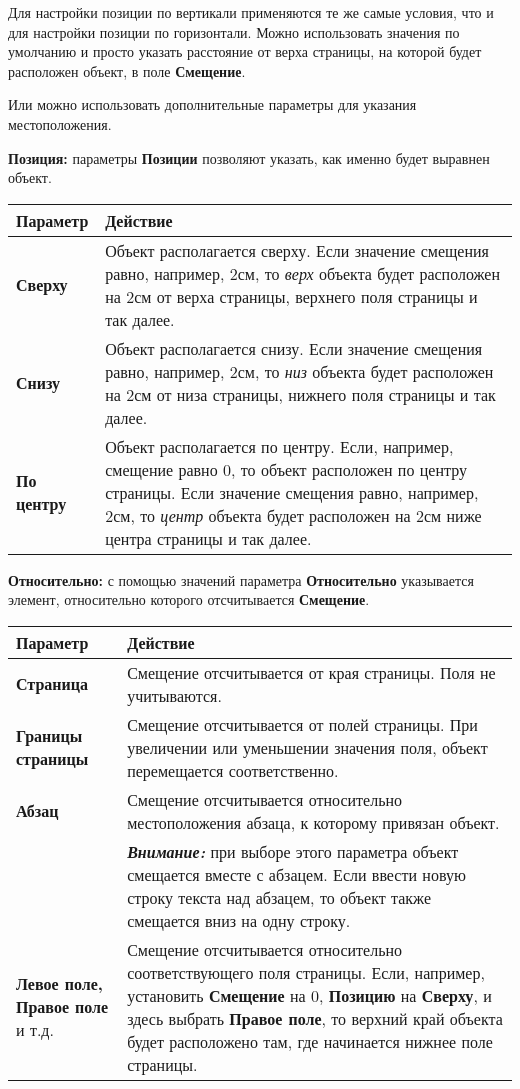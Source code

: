 ﻿\documentclass[a4paper,10pt]{article}
\begin{document}
 Для настройки позиции по вертикали применяются те же самые условия, что и для настройки позиции по горизонтали. Можно использовать значения по умолчанию и просто указать расстояние от верха страницы, на которой будет расположен объект, в поле \textbf{Смещение}.
 
 Или можно использовать дополнительные параметры для указания местоположения.
 
 \textbf{Позиция:} параметры \textbf{Позиции} позволяют указать, как именно будет выравнен объект.
 
 \begin{center}
\begin{tabular}{  m{4cm}  m{12cm}  }
 \textbf{Параметр} & \textbf{Действие}\\ 
 \hline
  \textbf{Сверху} & Объект располагается сверху. Если значение смещения равно, например, 2см, то \textit{верх} объекта будет расположен на 2см от верха страницы, верхнего поля страницы и так далее.\\
  \textbf{Снизу} & Объект располагается снизу. Если значение смещения равно, например, 2см, то \textit{низ} объекта будет расположен на 2см от низа страницы, нижнего поля страницы и так далее.\\ 
\textbf{По центру} & Объект располагается по центру. Если, например, смещение равно 0, то объект расположен по центру страницы. Если значение смещения равно, например, 2см, то \textit{центр} объекта будет расположен на 2см ниже центра страницы и так далее.\\
\end{tabular}
\end{center}

\textbf{Относительно:} с помощью значений параметра \textbf{Относительно} указывается элемент, относительно которого отсчитывается \textbf{Смещение}.

\begin{center}
\begin{tabular}{  m{4cm}  m{12cm}  }
 \textbf{Параметр} & \textbf{Действие}\\ 
 \hline
  \textbf{Страница} & Смещение отсчитывается от края страницы. Поля не учитываются.\\
  \textbf{Границы страницы} & Смещение отсчитывается от полей страницы. При увеличении или уменьшении значения поля, объект перемещается соответственно.\\ 
\textbf{Абзац} & Смещение отсчитывается относительно местоположения абзаца, к которому привязан объект.\\
\textbf{} & \textit{\textbf{Внимание:}} при выборе этого параметра объект смещается вместе с абзацем. Если ввести новую строку текста над абзацем, то объект также смещается вниз на одну строку.\\
\textbf{Левое поле, Правое поле} и т.д. & Смещение отсчитывается относительно соответствующего поля страницы. Если, например, установить \textbf{Смещение} на 0, \textbf{Позицию} на \textbf{Сверху}, и здесь выбрать \textbf{Правое поле}, то верхний край объекта будет расположено там, где начинается нижнее поле страницы.
\end{tabular}
\end{center}
\end{document}
